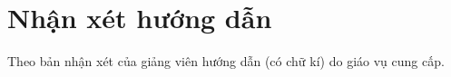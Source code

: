 \chapter*{Nhận xét hướng dẫn}

Theo bản nhận xét của giảng viên hướng dẫn (có chữ kí) do giáo vụ cung cấp.